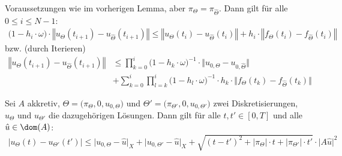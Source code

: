 \begin{lemma}
Voraussetzungen wie im vorherigen Lemma, aber $\pi_\Theta=\pi_{\hat{\Theta}}$. Dann gilt für alle $0\leq i\leq N-1$:
\begin{align*}
\big(1-h_i\cdot\omega\big)\cdot\left\Vert u_\Theta(t_{i+1})-u_{\hat{\Theta}}(t_{i+1})\right\Vert
\leq\left\Vert u_\Theta(t_i)-u_{\hat{\Theta}}(t_i)\right\Vert
+h_i\cdot\left\Vert f_\Theta(t_i)-f_{\hat{\Theta}}(t_i)\right\Vert
\end{align*}
bzw. (durch Iterieren)
\begin{align*}
\left\Vert u_\Theta(t_{i+1})-u_{\hat{\Theta}}(t_{i+1})\right\Vert
&\leq\prod\limits_{k=0}^i\big(1-h_k\cdot\omega\big)^{-1}\cdot\big\Vert u_{0,\Theta}-u_{0,\hat{\Theta}}\big\Vert\\
&+\sum\limits_{k=0}^i\prod\limits_{l=k}^i\big(1-h_l\cdot\omega\big)^{-1}\cdot h_k\cdot\Big\Vert f_\Theta(t_k)-f_{\hat{\Theta}}(t_k)\Big\Vert
\end{align*}
\end{lemma}

\begin{theorem}
Sei $A$ akkretiv, $\Theta=\big(\pi_\Theta,0,u_{0,\Theta}\big)$ und $\Theta'=\big(\pi_{\Theta'},0,u_{0,\Theta'}\big)$ zwei Diskretisierungen, $u_\Theta$ und $u_{\Theta'}$ die dazugehörigen Lösungen. Dann gilt für alle $t,t'\in[0,T]$ und alle $\hat{u}\in\dom(A)$:
\begin{align*}
\big| u_\Theta(t)-u_{\Theta'}(t')\big|
\leq\big|u_{0,\Theta}-\hat{u}\big|_X+\big| u_{0,\Theta'}-\hat{u}\big|_X+\sqrt{(t-t')^2+|\pi_\Theta|\cdot t+|\pi_{\Theta'}|\cdot t'}\cdot|A\hat{u}\big|^2
\end{align*}
\end{theorem}
